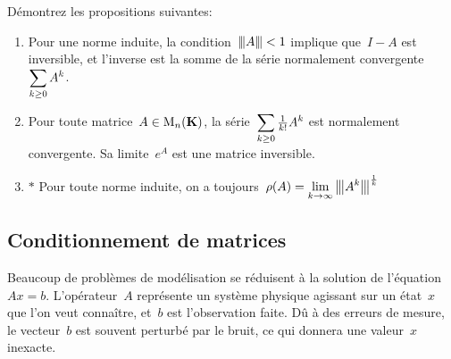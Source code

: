 
\begin{exercice}
	Démontrez les propositions suivantes:
	\begin{enumerate}
		\item Pour une norme induite, la condition~${\left\vert\kern-0.25ex\left\vert\kern-0.25ex\left\vert A \right\vert\kern-0.25ex\right\vert\kern-0.25ex\right\vert}<1$ implique que~$I-A$
			est inversible, et l'inverse est la somme de la série
			normalement convergente~$\displaystyle\sum_{k\ge0}A^k$.
		\item Pour toute matrice~$A\in\mathrm{M}_n(\mathbf{K})$, la
			série~$\displaystyle\sum_{k\ge0}\tfrac1{k!}A^k$ est normalement convergente.
			Sa limite~$e^A$ est une matrice inversible.
		\item $*$ Pour toute norme induite, on a
			toujours~$\displaystyle\rho(A)=\lim_{k\to\infty}{\left\vert\kern-0.25ex\left\vert\kern-0.25ex\left\vert A^k \right\vert\kern-0.25ex\right\vert\kern-0.25ex\right\vert}^{\frac1k}$
	\end{enumerate}
\end{exercice}


\subsection{Conditionnement de matrices}

Beaucoup de problèmes de modélisation se réduisent à la solution de
l'équation~$Ax=b$.  L'opérateur~$A$ représente un système physique agissant
sur un état~$x$ que l'on veut connaître, et~$b$ est l'observation faite.
Dû à des erreurs de mesure, le vecteur~$b$ est souvent perturbé par le bruit,
ce qui donnera une valeur~$x$ inexacte.

